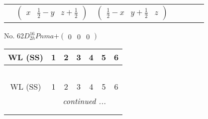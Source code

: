 \documentclass[fleqn,9pt,landscape]{jsarticle}
\begin{document}
\begin{center}
\begin{longtable}{ccccccc}
& $ \begin{pmatrix} x & \frac{1}{2} - y & z + \frac{1}{2} \end{pmatrix} $ & $ \begin{pmatrix} \frac{1}{2} - x & y + \frac{1}{2} & z \end{pmatrix} $ & $  $ & $  $ & $  $ & $  $ \\
\end{longtable}
\end{center}
\newpage
No. 62\quad$D_{2h}^{16}$\quad$Pnma$\quad[ orthorhombic ]\quad$+\begin{pmatrix} 0 & 0 & 0 \end{pmatrix}$
\begin{center}
\renewcommand{\arraystretch}{1.2}
\begin{longtable}{ccccccc}
 \hline \hline
WL (SS) & 1 & 2 & 3 & 4 & 5 & 6 \\ \hline \endfirsthead

\multicolumn{6}{l}{\tablename\ \thetable{}} \\
 \hline \hline
WL (SS) & 1 & 2 & 3 & 4 & 5 & 6 \\ \hline \endhead

 \hline \hline
\multicolumn{6}{r}{\footnotesize\it continued ...} \\ \endfoot

 \hline \hline
\multicolumn{6}{r}{} \\ \endlastfoot


\end{longtable}
\end{center}
\end{document}
